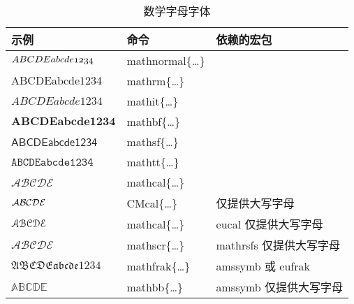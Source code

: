 \documentclass{article}
\begin{document}
\begin{table}[htp]
  \centering
  \caption{数学字母字体} \label{tbl:math-fonts}
  \begin{tabular}{*{3}{l}}
  \hline
  \textbf{示例}    & \textbf{命令} & \textbf{依赖的宏包}\\
  \hline
  $\mathnormal{ABCDE abcde 1234}$  & {mathnormal}\{\ldots\}&       \\
  $\mathrm{ABCDE abcde 1234}$      & {mathrm}\{\ldots\}    &       \\
  $\mathit{ABCDE abcde 1234}$      & {mathit}\{\ldots\}    &       \\
  $\mathbf{ABCDE abcde 1234}$      & {mathbf}\{\ldots\}    &       \\
  $\mathsf{ABCDE abcde 1234}$      & {mathsf}\{\ldots\}    &       \\
  $\mathtt{ABCDE abcde 1234}$      & {mathtt}\{\ldots\}    &       \\
  $\mathcal{ABCDE}$                  & {mathcal}\{\ldots\}   &     \\ 
  $\CMcal{ABCDE}$                  & {CMcal}\{\ldots\}   & 仅提供大写字母 \\
  \hline
  $\EuScript{ABCDE}$               & {mathcal}\{\ldots\}   & {eucal} 仅提供大写字母 \\
  $\mathscr{ABCDE}$                & {mathscr}\{\ldots\}   & {mathrsfs} 仅提供大写字母\\
  $\mathfrak{ABCDE abcde 1234}$    & {mathfrak}\{\ldots\}  & {amssymb} 或 {eufrak}  \\
  $\mathbb{ABCDE}$                 & {mathbb}\{\ldots\}    & {amssymb} 仅提供大写字母 \\
  \hline
  \end{tabular}
\end{table}
\end{document}
